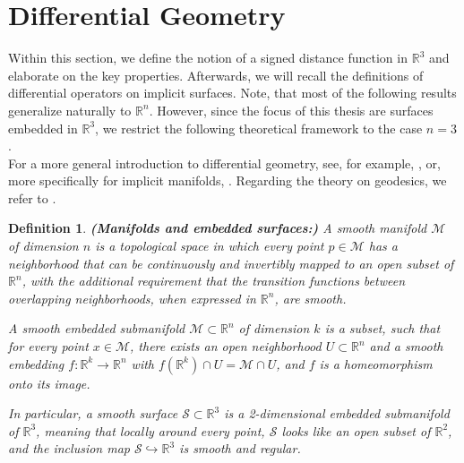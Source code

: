 \documentclass[draft,12pt,openany]{book}
\newcommand{\R}{\mathbb{R}}
\theoremstyle{plainnormal}
\newtheorem{definition}[theorem]{Definition}
\theoremstyle{remark}
\begin{document}
\section{Differential Geometry}
Within this section, we define the notion of a signed distance function in $\R^3$ and elaborate on the key properties. Afterwards, we will recall the definitions of differential operators on implicit surfaces. Note, that most of the following results generalize naturally to $\R^n$. However, since the focus of this thesis are surfaces embedded in $\R^3$, we restrict the following theoretical framework to the case $n=3$.\\
For a more general introduction to differential geometry, see, for example, \cite{Lee00}, or, more specifically for implicit manifolds, \cite{Dziuk_Elliott_2013}. Regarding the theory on geodesics, we refer to \cite{Dacorogna}.
\begin{definition}\textbf{(Manifolds and embedded surfaces:)}
A \emph{smooth manifold} \(\mathcal{M}\) of dimension \(n\) is a topological space in which every point \(p \in \mathcal{M}\) has a neighborhood that can be continuously and invertibly mapped to an open subset of \(\mathbb{R}^n\), with the additional requirement that the transition functions between overlapping neighborhoods, when expressed in \(\mathbb{R}^n\), are smooth.\par
A \emph{smooth embedded submanifold} \(\mathcal{M} \subset \mathbb{R}^n\) of dimension \(k\) is a subset, such that for every point \(x \in \mathcal{M}\), there exists an open neighborhood \(U \subset \mathbb{R}^n\) and a smooth embedding \(f: \mathbb{R}^k \to \mathbb{R}^n\) with \(f(\mathbb{R}^k) \cap U = \mathcal{M} \cap U\), and \(f\) is a homeomorphism onto its image.\par
In particular, a \emph{smooth surface} \(\mathcal{S} \subset \mathbb{R}^3\) is a 2-dimensional embedded submanifold of \(\mathbb{R}^3\), meaning that locally around every point, \(\mathcal{S}\) looks like an open subset of \(\mathbb{R}^2\), and the inclusion map \(\mathcal{S} \hookrightarrow \mathbb{R}^3\) is smooth and regular.
\end{definition}
\end{document}
